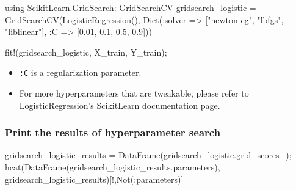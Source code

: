 \documentclass[
  letterpaper,
]{book}
\newenvironment{Shaded}{\begin{snugshade}}{\end{snugshade}}
\newcommand{\BuiltInTok}[1]{\textcolor[rgb]{0.00,0.23,0.31}{#1}}
\newcommand{\FloatTok}[1]{\textcolor[rgb]{0.68,0.00,0.00}{#1}}
\newcommand{\FunctionTok}[1]{\textcolor[rgb]{0.28,0.35,0.67}{#1}}
\newcommand{\ImportTok}[1]{\textcolor[rgb]{0.00,0.46,0.62}{#1}}
\newcommand{\NormalTok}[1]{\textcolor[rgb]{0.00,0.23,0.31}{#1}}
\newcommand{\OperatorTok}[1]{\textcolor[rgb]{0.37,0.37,0.37}{#1}}
\newcommand{\StringTok}[1]{\textcolor[rgb]{0.13,0.47,0.30}{#1}}
\providecommand{\tightlist}{%
  \setlength{\itemsep}{0pt}\setlength{\parskip}{0pt}}\usepackage{longtable,booktabs,array}
\begin{document}
\begin{Shaded}
\begin{Highlighting}[]
\ImportTok{using} \BuiltInTok{ScikitLearn.GridSearch}\NormalTok{: GridSearchCV}
\NormalTok{gridsearch\_logistic }\OperatorTok{=} \FunctionTok{GridSearchCV}\NormalTok{(}\FunctionTok{LogisticRegression}\NormalTok{(),}
            \FunctionTok{Dict}\NormalTok{(}\OperatorTok{:}\NormalTok{solver }\OperatorTok{=\textgreater{}}\NormalTok{ [}\StringTok{"newton{-}cg"}\NormalTok{, }\StringTok{"lbfgs"}\NormalTok{, }\StringTok{"liblinear"}\NormalTok{], }
            \OperatorTok{:}\NormalTok{C }\OperatorTok{=\textgreater{}}\NormalTok{ [}\FloatTok{0.01}\NormalTok{, }\FloatTok{0.1}\NormalTok{, }\FloatTok{0.5}\NormalTok{, }\FloatTok{0.9}\NormalTok{]))}

\FunctionTok{fit!}\NormalTok{(gridsearch\_logistic, X\_train, Y\_train);}
\end{Highlighting}
\end{Shaded}

\begin{itemize}
\tightlist
\item
  \texttt{:C} is a regularization parameter.
\item
  For more hyperparameters that are tweakable, please refer to
  LogisticRegression's ScikitLearn documentation page.
\end{itemize}

\hypertarget{print-the-results-of-hyperparameter-search}{%
\subsubsection*{Print the results of hyperparameter
search}\label{print-the-results-of-hyperparameter-search}}

\begin{Shaded}
\begin{Highlighting}[]
\NormalTok{gridsearch\_logistic\_results }\OperatorTok{=} \FunctionTok{DataFrame}\NormalTok{(gridsearch\_logistic.grid\_scores\_);}
\FunctionTok{hcat}\NormalTok{(}\FunctionTok{DataFrame}\NormalTok{(gridsearch\_logistic\_results.parameters), }
\NormalTok{    gridsearch\_logistic\_results)[!,}\FunctionTok{Not}\NormalTok{(}\OperatorTok{:}\NormalTok{parameters)]}
\end{Highlighting}
\end{Shaded}
\end{document}
